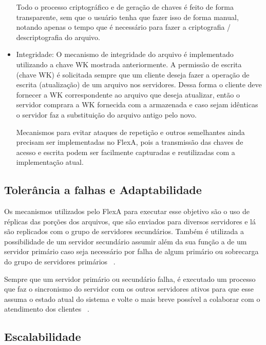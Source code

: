 \begin{itemize}
        	    Todo o processo criptográfico e de geração de chaves é feito de forma transparente, sem que o usuário tenha que fazer isso de forma manual, notando apenas o tempo que é necessário para fazer a criptografia / descriptografia do arquivo.
    	    
        \item Integridade: O mecanismo de integridade do arquivo é implementado utilizando a chave WK mostrada anteriormente. A permissão de escrita (chave WK) é solicitada sempre que um cliente deseja fazer a operação de escrita (atualização) de um arquivo nos servidores. Dessa forma o cliente deve fornecer a WK correspondente ao arquivo que deseja atualizar, então o servidor comprara a WK fornecida com a armazenada e caso sejam idênticas o servidor faz a substituição do arquivo antigo pelo novo.
        
        Mecanismos para evitar ataques de repetição e outros semelhantes ainda precisam ser implementadas no FlexA, pois a transmissão das chaves de acesso e escrita podem ser facilmente capturadas e reutilizadas com a implementação atual.
        
    \end{itemize}
    
    \subsection{Tolerância a falhas e Adaptabilidade}
        
        Os mecanismos utilizados pelo FlexA para executar esse objetivo são o uso de réplicas das porções dos arquivos, que são enviados para diversos servidores e lá são replicados com o grupo de servidores secundários. Também é utilizada a possibilidade de um servidor secundário assumir além da sua função a de um servidor primário caso seja necessário por falha de algum primário ou sobrecarga do grupo de servidores primários ~\cite{mario}.
        
        Sempre que um servidor primário ou secundário falha, é executado um processo que faz o sincronismo do servidor com os outros servidores ativos para que esse assuma o estado atual do sistema e volte o mais breve possível a colaborar com o atendimento dos clientes ~\cite{silas}.
        
    
    \subsection{Escalabilidade}
    
